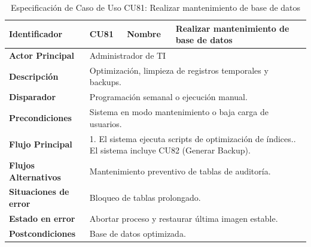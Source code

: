 \begingroup
\setlength{\parskip}{0pt}
\begin{longtable}{|p{3.5cm}|p{2cm}|p{2.5cm}|p{7cm}|}
\caption{Especificación de Caso de Uso CU81: Realizar mantenimiento de base de datos}
\label{tab:cu81} \\
\hline
\textbf{Identificador} & CU81 & \textbf{Nombre} & Realizar mantenimiento de base de datos \\ \hline
\textbf{Actor Principal} & \multicolumn{3}{p{11.5cm}|}{Administrador de TI} \\ \hline
\textbf{Descripción} & \multicolumn{3}{p{11.5cm}|}{Optimización, limpieza de registros temporales y backups.} \\ \hline
\textbf{Disparador} & \multicolumn{3}{p{11.5cm}|}{Programación semanal o ejecución manual.} \\ \hline
\textbf{Precondiciones} & \multicolumn{3}{p{11.5cm}|}{Sistema en modo mantenimiento o baja carga de usuarios.} \\ \hline
\textbf{Flujo Principal} & \multicolumn{3}{p{11.5cm}|}{1. El sistema ejecuta scripts de optimización de índices.\newline 2. El sistema incluye CU82 (Generar Backup).} \\ \hline
\textbf{Flujos Alternativos} & \multicolumn{3}{p{11.5cm}|}{Mantenimiento preventivo de tablas de auditoría.} \\ \hline
\textbf{Situaciones de error} & \multicolumn{3}{p{11.5cm}|}{Bloqueo de tablas prolongado.} \\ \hline
\textbf{Estado en error} & \multicolumn{3}{p{11.5cm}|}{Abortar proceso y restaurar última imagen estable.} \\ \hline
\textbf{Postcondiciones} & \multicolumn{3}{p{11.5cm}|}{Base de datos optimizada.} \\ \hline
\end{longtable}
\endgroup

\vspace{0.8cm}

